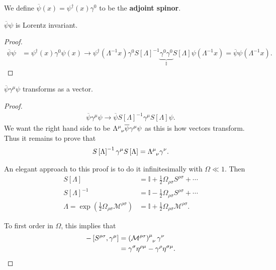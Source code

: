 
\begin{definition}
    We define $\overline{\psi} \left( x \right) = \psi^{\dag} \left( x \right) \gamma^{0}$ to be the \textbf{adjoint spinor}.
\end{definition}

\begin{claim}
    $\overline{\psi} \psi$ is Lorentz invariant.
\end{claim}

\begin{proof}
    \begin{align}
        \overline{\psi} \psi &= \psi^{\dag} \left( x \right) \gamma^{0} \psi \left( x \right) \to \psi^{\dag} \left( \Lambda^{-1} x  \right) \gamma^{0} S\left[ \Lambda \right]^{-1} \underbrace{\gamma^{0} \gamma^{0}}_{\mathbb{I}} S \left[ \Lambda \right] \psi \left( \Lambda^{-1} x \right)  = \overline{\psi} \psi \left( \Lambda^{-1} x \right) 
    .\end{align}
\end{proof}

\begin{claim}
    $\overline{\psi} \gamma^{\mu} \psi$ transforms as a vector.
\end{claim}

\begin{proof}
    \begin{align}
        \overline{\psi} \gamma^{\mu} \psi \to \overline{\psi} S \left[ \Lambda \right]^{-1} \gamma^{\mu} S\left[ \Lambda \right]  \psi 
    .\end{align}
    We want the right hand side to be $\tensor{\Lambda}{^{\mu}_{\nu}} \overline{\psi}\gamma^{\mu} \psi$ as this is how vectors transform. Thus it remains to prove that
    \begin{align}
        S \left[ \Lambda \right]^{-1} \gamma^{\mu} S \left[ \Lambda \right] = \tensor{\Lambda}{^{\mu}_\nu} \gamma^{\nu}
    .\end{align}

    An elegant approach to this proof is to do it infinitesimally with $\Omega \ll 1$. Then
    \begin{align}
        S \left[ \Lambda \right] &= \mathbb{I} + \frac{1}{2} \Omega_{\rho \sigma} S^{\rho \sigma} + \cdots \\
        S \left[ \Lambda \right]^{-1} &= \mathbb{I} - \frac{1}{2} \Omega_{\rho \sigma} S^{\rho \sigma} + \cdots \\
        \Lambda = \exp \left( \frac{1}{2} \Omega_{\rho \sigma} \mathcal{M}^{\rho \sigma} \right)  &= \mathbb{I} + \frac{1}{2} \Omega_{\rho \sigma} \mathcal{M}^{\rho \sigma}
    .\end{align}

    To first order in $\Omega$, this implies that
    \begin{align}
        -\left[ S^{\rho \sigma}, \gamma^{\mu} \right] &= \tensor{\left( \mathcal{M}^{\rho \sigma} \right)}{^{\mu}_\nu} \gamma^{\nu} \\
        &= \gamma^{\sigma} \eta^{\rho \mu} - \gamma^{\rho} \eta^{\sigma \mu}
    .\end{align}
\end{proof}

